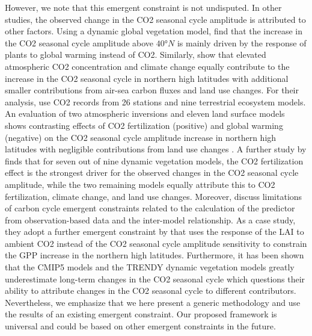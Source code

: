 However, we note that this emergent constraint is not undisputed. In other
studies, the observed change in the \ac{CO2} seasonal cycle amplitude is
attributed to other factors. Using a dynamic global vegetation model,
\textcite{Forkel2016} find that the increase in the \ac{CO2} seasonal cycle
amplitude above $40 \unit{\degree N}$ is mainly driven by the response of
plants to global warming instead of \ac{CO2}. Similarly, \textcite{Piao2018}
show that elevated atmospheric \acs{CO2} concentration and climate change
equally contribute to the increase in the \ac{CO2} seasonal cycle in northern
high latitudes with additional smaller contributions from air-sea carbon fluxes
and land use changes. For their analysis, \textcite{Piao2018} use \ac{CO2}
records from 26 stations and nine terrestrial ecosystem models. An evaluation
of two atmospheric inversions and eleven land surface models shows contrasting
effects of \ac{CO2} fertilization (positive) and global warming (negative) on
the \ac{CO2} seasonal cycle amplitude increase in northern high latitudes with
negligible contributions from land use changes \autocite{Bastos2019}. A further
study by \textcite{Zhao2016} finds that for seven out of nine dynamic
vegetation models, the \ac{CO2} fertilization effect is the strongest driver
for the observed changes in the \ac{CO2} seasonal cycle amplitude, while the
two remaining models equally attribute this to \ac{CO2} fertilization, climate
change, and land use changes. Moreover, \textcite{Winkler2019a} discuss
limitations of carbon cycle emergent constraints related to the calculation of
the predictor from observation-based data and the inter-model relationship. As
a case study, they adopt a further emergent constraint by
\textcite{Winkler2019} that uses the response of the \ac{LAI} to ambient
\ac{CO2} instead of the \ac{CO2} seasonal cycle amplitude sensitivity to
constrain the \ac{GPP} increase in the northern high latitudes. Furthermore, it
has been shown that the \acs{CMIP}5 models \autocite{Graven2013} and the TRENDY
dynamic vegetation models \autocite{Thomas2016} greatly underestimate long-term
changes in the \ac{CO2} seasonal cycle which questions their ability to
attribute changes in the \ac{CO2} seasonal cycle to different contributors.
Nevertheless, we emphasize that we here present a generic methodology and use
the results of an existing emergent constraint. Our proposed framework is
universal and could be based on other emergent constraints in the future.


